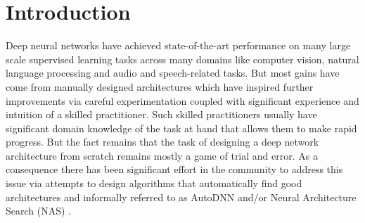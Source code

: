 

\section{Introduction}

Deep neural networks have achieved state-of-the-art performance on many large scale supervised learning tasks across many domains like computer vision, natural language processing and audio and speech-related tasks. But most gains have come from manually designed architectures which have inspired further improvements via careful experimentation coupled with significant experience and intuition of a skilled practitioner. Such skilled practitioners usually have significant domain knowledge of the task at hand that allows them to make rapid progress. But the fact remains that the task of designing a deep network architecture from scratch remains mostly a game of trial and error. As a consequence there has been significant effort in the community to address this issue via attempts to design algorithms that automatically find good architectures and informally referred to as AutoDNN and/or Neural Architecture Search (NAS) \cite{nas}. 

